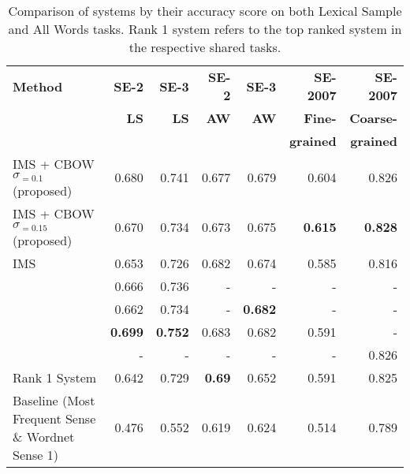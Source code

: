 \begin{table}[th]
	\caption{Comparison of systems by their accuracy score on both Lexical Sample and All Words tasks. Rank 1 system refers to the top ranked system in the respective shared tasks.}
	\label{table:top-other-systems}
	\begin{center}
		\begin{tabular}{|p{4.5cm}|r|r|r|r|r|r|}
			\hline
			{\bf Method} & {\bf SE-2} & {\bf SE-3} & {\bf SE-2} & {\bf SE-3} & {\bf SE-2007} & {\bf SE-2007} \\
             	  &  {\bf LS} &  {\bf LS} & {\bf AW} & {\bf AW} &  {\bf Fine-} & {\bf Coarse-} \\
   	 &	   &     &    &    &  {\bf grained} & {\bf grained} \\
           
			\hline
			IMS + CBOW $\sigma _{=0.1}$ (proposed) & 0.680 & 0.741 & 0.677 & 0.679 & 0.604 & 0.826\\
			\hline
            IMS + CBOW $\sigma _{=0.15}$ (proposed) & 0.670 & 0.734 & 0.673 & 0.675 & {\bf0.615} & {\bf 0.828 } \\
			\hline
			
			IMS & 0.653 & 0.726 & 0.682 & 0.674 & 0.585 & 0.816\\
			\hline
			
			\newcite{rothe2015autoextend} & 0.666 & 0.736 & - & - & - & - \\
			\hline
			\newcite{Taghipour15} & 0.662 & 0.734 & -& {\bf0.682} & - & - \\
			\hline
           	 \cite{Iacobacci2016}  & {\bf0.699} & {\bf0.752} & 0.683 & 0.682 & 0.591 & - \\
            \hline
             \cite{chen2014} & -& - & - & - & - & 0.826  \\
             \hline
			Rank 1 System & 0.642
            & 0.729 
            & {\bf0.69} & 0.652 & 0.591 & 0.825  \\
            

			\hline
			Baseline (Most Frequent Sense \& Wordnet Sense 1) & 0.476 & 0.552& 0.619 & 0.624 & 0.514 & 0.789 \\
			\hline
		\end{tabular}
	\end{center}
\end{table}



